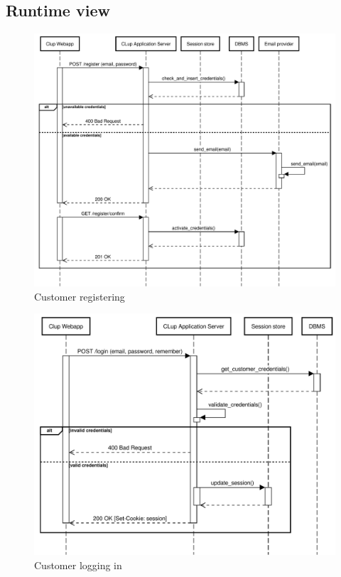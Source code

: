 \subsection{Runtime view}
\begin{figure}[H]
    \centering
    \includegraphics[width=1\textwidth]{Images/runtime_registration.pdf}
    \caption{Customer registering}
\end{figure}
\begin{figure}[H]
    \centering
    \includegraphics[width=1\textwidth]{Images/runtime_login.pdf}
    \caption{Customer logging in}
\end{figure}
